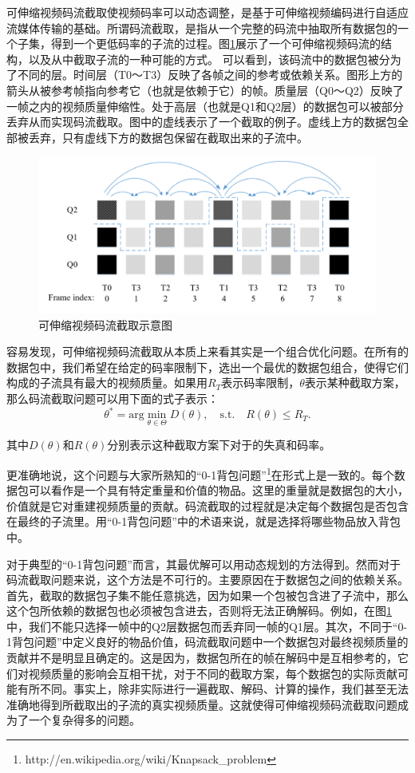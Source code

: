 可伸缩视频码流截取使视频码率可以动态调整，是基于可伸缩视频编码进行自适应流媒体传输的基础。所谓码流截取，是指从一个完整的码流中抽取所有数据包的一个子集，得到一个更低码率的子流的过程。图\ref{fig:Bitstream-Extraction}展示了一个可伸缩视频码流的结构，以及从中截取子流的一种可能的方式。
可以看到，该码流中的数据包被分为了不同的层。时间层（T0～T3）反映了各帧之间的参考或依赖关系。图形上方的箭头从被参考帧指向参考它（也就是依赖于它）的帧。质量层（Q0～Q2）反映了一帧之内的视频质量伸缩性。处于高层（也就是Q1和Q2层）的数据包可以被部分丢弃从而实现码流截取。图中的虚线表示了一个截取的例子。虚线上方的数据包全部被丢弃，只有虚线下方的数据包保留在截取出来的子流中。

\begin{figure}[h]
\centering
\includegraphics[width = 0.9\linewidth]{./figures/Bitstream-Extraction.jpg}
\caption{可伸缩视频码流截取示意图\label{fig:Bitstream-Extraction}}
\end{figure}

容易发现，可伸缩视频码流截取从本质上来看其实是一个组合优化问题。在所有的数据包中，我们希望在给定的码率限制下，选出一个最优的数据包组合，使得它们构成的子流具有最大的视频质量。如果用$R_T$表示码率限制，$\theta$表示某种截取方案，那么码流截取问题可以用下面的式子表示：
\begin{equation}
{\theta}^* = \mathrm{arg} \min \limits_{\theta \in \Theta} D(\theta), \quad  \mathrm{s.t. } \quad R(\theta) \le R_T.
\end{equation}

其中$D(\theta)$和$R(\theta)$分别表示这种截取方案下对于的失真和码率。

更准确地说，这个问题与大家所熟知的“0-1背包问题”\footnote{http://en.wikipedia.org/wiki/Knapsack\_problem}在形式上是一致的。每个数据包可以看作是一个具有特定重量和价值的物品。这里的重量就是数据包的大小，价值就是它对重建视频质量的贡献。码流截取的过程就是决定每个数据包是否包含在最终的子流里。用“0-1背包问题”中的术语来说，就是选择将哪些物品放入背包中。

对于典型的“0-1背包问题”而言，其最优解可以用动态规划的方法得到。然而对于码流截取问题来说，这个方法是不可行的。主要原因在于数据包之间的依赖关系。首先，截取的数据包子集不能任意挑选，因为如果一个包被包含进了子流中，那么这个包所依赖的数据包也必须被包含进去，否则将无法正确解码。例如，在图\ref{fig:Bitstream-Extraction}中，我们不能只选择一帧中的Q2层数据包而丢弃同一帧的Q1层。其次，不同于“0-1背包问题”中定义良好的物品价值，码流截取问题中一个数据包对最终视频质量的贡献并不是明显且确定的。这是因为，数据包所在的帧在解码中是互相参考的，它们对视频质量的影响会互相干扰，对于不同的截取方案，每个数据包的实际贡献可能有所不同。事实上，除非实际进行一遍截取、解码、计算的操作，我们甚至无法准确地得到所截取出的子流的真实视频质量。这就使得可伸缩视频码流截取问题成为了一个复杂得多的问题。

